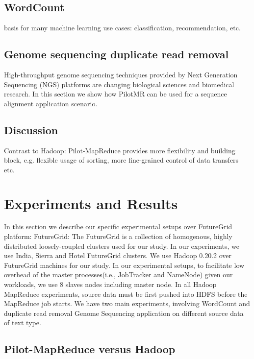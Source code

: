 \documentclass{acm_proc_article-sp}
\newcommand{\pilotmapreduce}{Pilot-MapReduce\xspace}
\begin{document}
\subsection{WordCount}

basis for many machine learning use cases: classification, recommendation, etc.

\subsection{Genome sequencing duplicate read removal}

High-throughput genome sequencing techniques provided by Next Generation
Sequencing (NGS) platforms are changing biological sciences and biomedical
research. In this section we show how PilotMR can be used for a sequence
alignment application scenario.

\subsection{Discussion}

Contrast to Hadoop:
Pilot-MapReduce provides more flexibility and building block, e.g. flexible 
usage of sorting, more fine-grained control of data transfers etc.



\section{Experiments and Results}
In this section we describe our specific experimental setups over FutureGrid
platform: FutureGrid: The FutureGrid is a collection of homogenous, highly
distributed loosely-coupled clusters used for our study. In our experiments,
we use India, Sierra and Hotel FutureGrid clusters. We use Hadoop 0.20.2 over
FutureGrid machines for our study. In our experimental setups, to facilitate
low overhead of the master processes(i.e., JobTracker and NameNode) given our
workloads, we use 8 slaves nodes including master node. In all Hadoop
MapReduce experiments, source data must be first pushed into HDFS before the
MapReduce job starts. We have two main experiments, involving WordCount and
duplicate read removal Genome Sequencing application on different source data
of text type.

\subsection{\pilotmapreduce versus Hadoop}
\end{document}
